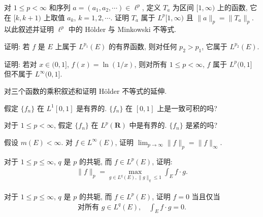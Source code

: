 \documentclass[../../main.tex]{subfiles}
\begin{document}
\begin{exercise}\label{exercise:ch07-12}
对 $1\leqslant p<\infty$ 和序列 $a=(a_{1},a_{2},\cdots)\in\ell^{p}$, 定义 $T_{a}$ 为区间 $[1,\infty)$ 上的函数, 它在 $[k,k+1)$ 上取值 $a_{k}$, $k=1,2,\cdots$. 证明 $T_{a}$ 属于 $L^{p}[1,\infty)$ 且 $\|a\|_{p}=\|T_{a}\|_{p}$. 以此叙述并证明 $\ell^{p}$ 中的 H\"older 与 Minkowski 不等式.
\end{exercise}

\begin{exercise}\label{exercise:ch07-13}
证明: 若 $f$ 是 $E$ 上属于 $L^{p_{1}}(E)$ 的有界函数, 则对任何 $p_{2}>p_{1}$, 它属于 $L^{p_{2}}(E)$.
\end{exercise}

\begin{exercise}\label{exercise:ch07-14}
证明: 若对 $x\in(0,1]$, $f(x)=\ln(1/x)$, 则对所有 $1\leqslant p<\infty$, $f$ 属于 $L^{p}(0,1]$ 但不属于 $L^{\infty}(0,1]$.
\end{exercise}

\begin{exercise}\label{exercise:ch07-15}
对三个函数的乘积叙述和证明 H\"older 不等式的延伸.
\end{exercise}

\begin{exercise}\label{exercise:ch07-16}
假定 $\{f_{n}\}$ 在 $L^{1}[0,1]$ 是有界的. $\{f_{n}\}$ 在 $[0,1]$ 上是一致可积的吗?
\end{exercise}

\begin{exercise}\label{exercise:ch07-17}
对于 $1\leqslant p<\infty$, 假定 $\{f_{n}\}$ 在 $L^{p}(\mathbf{R})$ 中是有界的. $\{f_{n}\}$ 是紧的吗?
\end{exercise}

\begin{exercise}\label{exercise:ch07-18}
假设 $m(E)<\infty$. 对 $f\in L^{\infty}(E)$, 证明 $\lim_{p\to\infty}\|f\|_{p}=\|f\|_{\infty}$.
\end{exercise}

\begin{exercise}\label{exercise:ch07-19}
对于 $1\leqslant p\leqslant\infty$, $q$ 是 $p$ 的共轭, 而 $f\in L^{p}(E)$, 证明:
\begin{align*}
\|f\|_{p}=\max_{g\in L^{q}(E),\|g\|_{q}\leqslant 1}\int_{E}f\cdot g.
\end{align*}
\end{exercise}

\begin{exercise}\label{exercise:ch07-20}
对于 $1\leqslant p\leqslant\infty$, $q$ 是 $p$ 的共轭, 而 $f\in L^{p}(E)$, 证明 $f=0$ 当且仅当
\begin{align*}
\text{对所有 }g\in L^{q}(E),\quad\int_{E}f\cdot g=0.
\end{align*}
\end{exercise}
\end{document}
